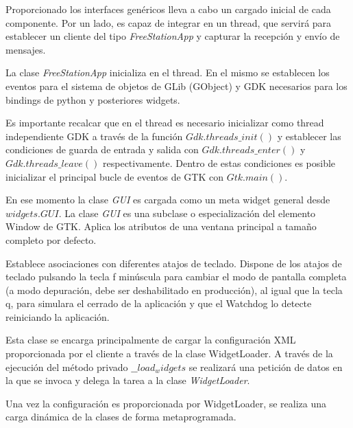 Proporcionado los interfaces genéricos lleva a cabo un cargado inicial de cada
componente. Por un lado, es capaz de integrar en un thread, que servirá para
establecer un cliente del tipo \emph{FreeStationApp} y capturar
la recepción y envío de mensajes.

La clase \emph{FreeStationApp} inicializa en el thread. En el mismo se
establecen los eventos para el sistema de objetos de GLib
(\acs{GObject}\label{acro:GObject}) y \acs{GDK}\label{acro:GDK} necesarios para
los bindings de python y posteriores widgets.

Es importante recalcar que en el thread es necesario inicializar como thread
independiente GDK a través de la función $Gdk.threads\_init()$ y establecer las
condiciones de guarda de entrada y salida con $Gdk.threads\_enter()$ y
$Gdk.threads\_leave()$ respectivamente. Dentro de estas condiciones es posible
inicializar el principal bucle de eventos de GTK con $Gtk.main()$.

En ese momento la clase \emph{GUI} es cargada como un meta widget general
desde $widgets.GUI$. La clase \emph{GUI} es una subclase o
especialización del elemento Window de GTK. Aplica los atributos de una 
ventana principal a tamaño completo por defecto.

Establece asociaciones con diferentes atajos de teclado. Dispone de los atajos
de teclado pulsando la tecla f minúscula para cambiar el modo de pantalla 
completa (a modo depuración, debe ser deshabilitado en
producción), al igual que la tecla q, para simulara el cerrado de la aplicación
y que el Watchdog lo detecte reiniciando la aplicación.

Esta clase se encarga principalmente de cargar la configuración XML
proporcionada por el cliente a través de la clase WidgetLoader. A través de la
ejecución del método privado $\_\_load_widgets$ se realizará una petición de
datos en la que se invoca y delega la tarea a la clase \emph{WidgetLoader}.

\newpage
Una vez la configuración es proporcionada por WidgetLoader, se realiza una carga
dinámica de la clases de forma metaprogramada.

